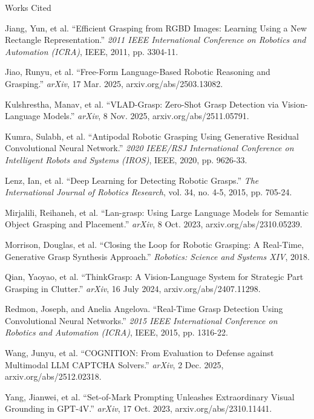 \documentclass[12pt,letterpaper]{article}
\newenvironment{workscited}{%
  \sloppy%
  \begin{list}{}{%
    \setlength{\leftmargin}{0.5in}%
    \setlength{\itemindent}{-0.5in}%
    \setlength{\labelwidth}{0pt}%
    \setlength{\labelsep}{0pt}%
    \setlength{\listparindent}{0pt}%
    \setlength{\topsep}{0pt}%
    \setlength{\partopsep}{0pt}%
    \setlength{\itemsep}{0pt}%
    \setlength{\parsep}{0pt}%
  }%
}{\end{list}}
\begin{document}
\newpage
\begin{center}
Works Cited
\end{center}

\begin{workscited}

\item Jiang, Yun, et al. ``Efficient Grasping from RGBD Images: Learning
Using a New Rectangle Representation.'' \textit{2011 IEEE International
Conference on Robotics and Automation (ICRA)}, IEEE, 2011, pp. 3304-11.

\item Jiao, Runyu, et al. ``Free-Form Language-Based Robotic Reasoning
and Grasping.'' \textit{arXiv}, 17 Mar. 2025, arxiv.org/abs/2503.13082.

\item Kulshrestha, Manav, et al. ``VLAD-Grasp: Zero-Shot Grasp Detection
via Vision-Language Models.'' \textit{arXiv}, 8 Nov. 2025,
arxiv.org/abs/2511.05791.

\item Kumra, Sulabh, et al. ``Antipodal Robotic Grasping Using
Generative Residual Convolutional Neural Network.'' \textit{2020
IEEE/RSJ International Conference on Intelligent Robots and Systems
(IROS)}, IEEE, 2020, pp. 9626-33.

\item Lenz, Ian, et al. ``Deep Learning for Detecting Robotic Grasps.''
\textit{The International Journal of Robotics Research}, vol. 34, no.
4-5, 2015, pp. 705-24.

\item Mirjalili, Reihaneh, et al. ``Lan-grasp: Using Large Language
Models for Semantic Object Grasping and Placement.'' \textit{arXiv}, 8
Oct. 2023, arxiv.org/abs/2310.05239.

\item Morrison, Douglas, et al. ``Closing the Loop for Robotic Grasping:
A Real-Time, Generative Grasp Synthesis Approach.'' \textit{Robotics:
Science and Systems XIV}, 2018.

\item Qian, Yaoyao, et al. ``ThinkGrasp: A Vision-Language System for
Strategic Part Grasping in Clutter.'' \textit{arXiv}, 16 July 2024,
arxiv.org/abs/2407.11298.

\item Redmon, Joseph, and Anelia Angelova. ``Real-Time Grasp Detection
Using Convolutional Neural Networks.'' \textit{2015 IEEE International
Conference on Robotics and Automation (ICRA)}, IEEE, 2015, pp. 1316-22.

\item Wang, Junyu, et al. ``COGNITION: From Evaluation to Defense
against Multimodal LLM CAPTCHA Solvers.'' \textit{arXiv}, 2 Dec. 2025,
arxiv.org/abs/2512.02318.

\item Yang, Jianwei, et al. ``Set-of-Mark Prompting Unleashes
Extraordinary Visual Grounding in GPT-4V.'' \textit{arXiv}, 17 Oct.
2023, arxiv.org/abs/2310.11441.

\end{workscited}
\end{document}
